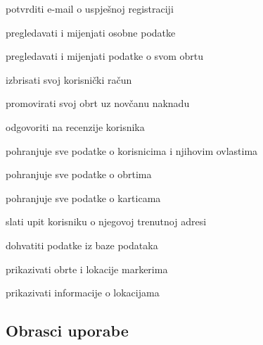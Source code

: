 \begin{packed_enum}
				\begin{packed_enum}
					\item potvrditi e-mail o uspješnoj registraciji
                    \item pregledavati i mijenjati osobne podatke
					\item pregledavati i mijenjati podatke o svom obrtu
                    \item izbrisati svoj korisnički račun
					\item promovirati svoj obrt uz novčanu naknadu
					\item odgovoriti na recenzije korisnika
					
				\end{packed_enum}
				
				\item  {}
				
				\begin{packed_enum}
					
					\item pohranjuje sve podatke o korisnicima i njihovim ovlastima
					\item pohranjuje sve podatke o obrtima
					\item pohranjuje sve podatke o karticama
					
				\end{packed_enum}
				
				\item  {}
				
				\begin{packed_enum}
				  
				  \item slati upit korisniku o njegovoj trenutnoj adresi
				  \item dohvatiti podatke iz baze podataka
				  \item prikazivati obrte i lokacije markerima
                  \item prikazivati informacije o lokacijama
				  
				\end{packed_enum}
				
			\end{packed_enum}
			
			\eject 	
			
				
			\subsection{Obrasci uporabe}
				
